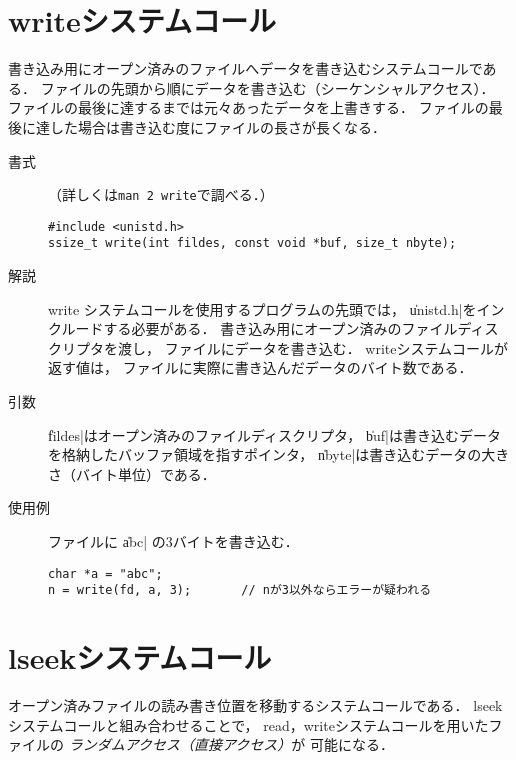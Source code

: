 \section{writeシステムコール}
書き込み用にオープン済みのファイルへデータを書き込むシステムコールである．
ファイルの先頭から順にデータを書き込む（シーケンシャルアクセス）．
ファイルの最後に達するまでは元々あったデータを上書きする．
ファイルの最後に達した場合は書き込む度にファイルの長さが長くなる．

\begin{description}
\item[書式]（詳しくは\texttt{man 2 write}で調べる．）

\begin{lstlisting}[numbers=none]
#include <unistd.h>
ssize_t write(int fildes, const void *buf, size_t nbyte);
\end{lstlisting}

\item[解説]
write システムコールを使用するプログラムの先頭では，
\|unistd.h|をインクルードする必要がある．
書き込み用にオープン済みのファイルディスクリプタを渡し，
ファイルにデータを書き込む．
writeシステムコールが返す値は，
ファイルに実際に書き込んだデータのバイト数である．

\item[引数]
\|fildes|はオープン済みのファイルディスクリプタ，
\|buf|は書き込むデータを格納したバッファ領域を指すポインタ，
\|nbyte|は書き込むデータの大きさ（バイト単位）である．

\item[使用例]
ファイルに \|abc| の3バイトを書き込む．

\begin{lstlisting}[numbers=none]
char *a = "abc";
n = write(fd, a, 3);       // nが3以外ならエラーが疑われる
\end{lstlisting}

\end{description}

\section{lseekシステムコール}
オープン済みファイルの読み書き位置を移動するシステムコールである．
lseekシステムコールと組み合わせることで，
read，writeシステムコールを用いたファイルの
\emph{ランダムアクセス（直接アクセス）}が
可能になる．

